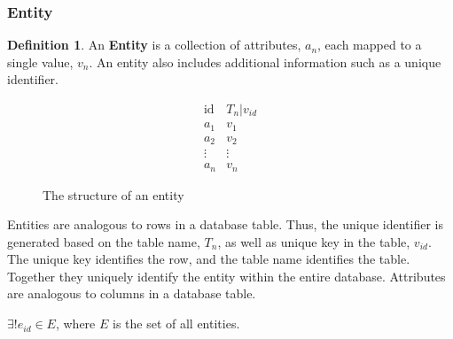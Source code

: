 \documentclass[12pt,letterpaper,oneside,notitlepage]{report}
\theoremstyle{definition}
\newtheorem{defn}{Definition}
\begin{document}
				\subsubsection{Entity}
					\begin{defn}
						An \textbf{Entity} is a collection of attributes, $a_n$, each mapped to a single value, $v_n$.  An entity also includes additional information such as a unique identifier.

						\begin{figure}[!ht]
							\centering
							\[
								\begin{array}{ll}
									\mathrm{id} & T_n|v_{id} \\
									a_1 & v_1 \\
									a_2 & v_2 \\
									\vdots & \vdots \\
									a_n & v_n
								\end{array}
							\]
							\caption{The structure of an entity}
							\label{fig:entity-rep}
						\end{figure}

						Entities are analogous to rows in a database table.  Thus, the unique identifier is generated based on the table name, $T_n$, as well as unique key in the table, $v_{id}$.  The unique key identifies the row, and the table name identifies the table.  Together they uniquely identify the entity within the entire database.  Attributes are analogous to columns in a database table.

						$\exists! e_{id} \in E$, where $E$ is the set of all entities.
					\end{defn}
\end{document}
